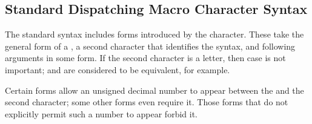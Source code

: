 \subsection{Standard Dispatching Macro Character Syntax}
\label{SHARP-SIGN-MACRO-CHARACTER-SECTION}

The standard syntax includes forms introduced by the \cd{\#} character.
These take the general form of a \cd{\#},
a second character that identifies the syntax,
and following arguments in some form.
If the second character is a letter, then case is not important;
 and  are considered to be equivalent, for example.

Certain \cd{\#} forms allow an unsigned decimal number to appear
between the \cd{\#} and the second character; some other
forms even require it.  Those forms that do not explicitly permit
such a number to appear forbid it.

